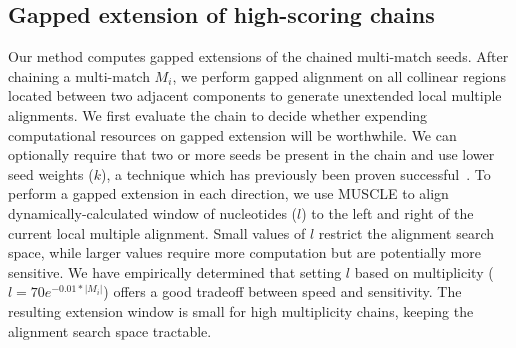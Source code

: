 \documentclass[10pt,journal,letterpaper,compsoc,peerreview]{IEEEtran}
\begin{document}
\subsection{Gapped extension of high-scoring chains}
Our method computes gapped extensions of the chained multi-match seeds.
After chaining a multi-match $M_i$, we perform gapped alignment on all
collinear regions located between two adjacent components to generate
unextended local multiple alignments. We first evaluate the chain to
decide whether expending computational resources on gapped extension
will be worthwhile. We can optionally require that two or more seeds be present
in the chain and use lower seed weights ($k$), a technique which has
previously been proven
successful~\cite{ref-blastz,ref-gappedblast,ref-blat}.  To perform a
gapped extension in each direction, we use MUSCLE to align dynamically-calculated window
of nucleotides ($l$) to the left and right of the current local
multiple alignment.  Small values of $l$ restrict the alignment search
space, while larger values require more computation but are
potentially more sensitive.  We have empirically determined that
setting $l$ based on multiplicity ($l = 70e^{-0.01*|M_{i}|}$) offers a
good tradeoff between speed and sensitivity.  The resulting extension
window is small for high multiplicity chains,
keeping the alignment search space tractable.
\end{document}
